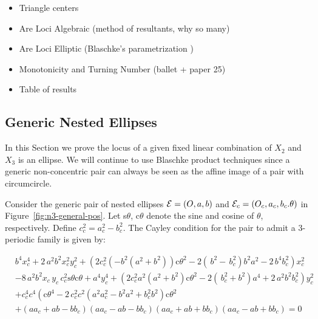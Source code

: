 

\begin{itemize}
    \item Triangle centers
    \item Are Loci Algebraic (method of resultants, why so many)
    \item Are Loci Elliptic (Blaschke's parametrization \cite{daepp-2019})
    \item Monotonicity and Turning Number (ballet + paper 25)
    \item Table of results
\end{itemize}

\subsection{Generic Nested Ellipses}
 
 In this Section we prove the locus of a given fixed linear combination of $X_2$ and $X_3$ is an ellipse. We will continue to use Blaschke product techniques since a generic non-concentric pair can always be seen as the affine image of a pair with circumcircle.

Consider the generic pair of nested ellipses $\mathcal{E}=(O,a,b)$ and $\mathcal{E}_c=(O_c,a_c,b_c.\theta)$ in Figure~\ref{fig:n3-general-pos}. Let s$\theta$, c$\theta$ denote the sine and cosine of $\theta$, respectively. Define $c_c^2=a_c^2-b_c^2$. The Cayley condition for the pair to admit a 3-periodic family is given by:

{\small
\begin{align}
&{b}^{4}x_c^{4}+2\,{a}^{2}{b}^{2}x_c^{2}y_c^{2}+
 \left(  2 c_c^2  \left( -{b}^{2}({a}^{2}+{b}^{2} )\right)  \text{c}\theta^2  - 2\left(  \,b ^{2}- \,b_c
^{2} \right) {b}^{2}{a}^{2}-2\,{b}^{4}b_c^{2} \right)x_c
^{2} \label{eqn:cayley}\\
&-8\,{a}^{2}{b}^{2}x_c\,{  y_c}\,c_c^2 
\text{s}\theta\text{c}\theta  +{a}^{4}y_c^{4} + \left(  2 c_c^2 a^2 \left(
{a}^{2}+{b}^{2}  \right)\text{c}\theta^2  
 -2 \left(  \,b_c^{2}+{b}^{2} \right) {a}^{4}+2
\,{a}^{2}{b}^{2}b_c^{2} \right) y_c^{2} \nonumber\\
&+ c_c^4  c^4  \left( \text{c}\theta^4-2\, c_c^2 c^2
  \left( {a}^{2} a_c^{2}-{b}^{2}{a}^{2}+
b_c^{2}{b}^{2} \right) \text{c}\theta^2 \right. \nonumber\\
 &+ \left( a a_c+a b-b b_c \right)  \left( a a_c
-a b -b b_c \right)  \left( a a_c+a b+b b_c \right)  \left( a
a_c-a b+b b_c \right) = 0\nonumber
\end{align}
}


